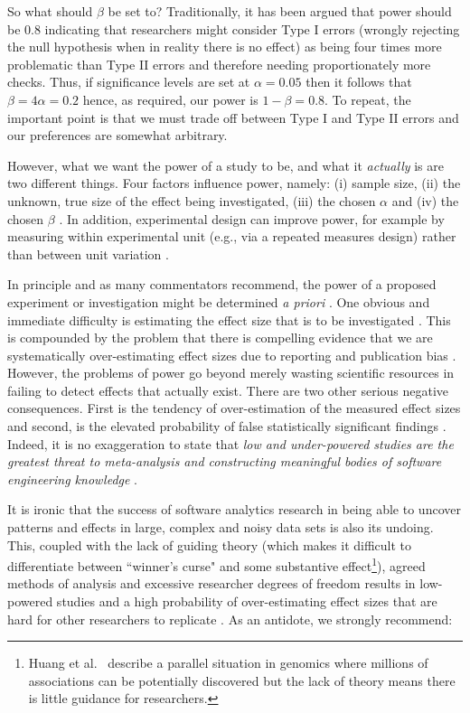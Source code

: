 \documentclass[preprint,10pt]{elsarticle}
\newcommand{\RED}{\color{red}}
\newcommand{\BLACK}{\color{black}}
\begin{document}
\RED So what should $\beta$ be set to?  \BLACK Traditionally, it has been argued that power should be 0.8 \cite{Cohe88} indicating that researchers might consider Type I errors (wrongly rejecting the null hypothesis when in reality there is no effect) as being four times more problematic than Type II errors and therefore needing proportionately more checks. Thus, if significance levels are set at $\alpha=0.05$ then it follows that $\beta = 4\alpha = 0.2$ hence, as required, our power is $1 - \beta = 0.8$.  To repeat, the important point is that we must trade off between Type I and Type II errors and our preferences are somewhat arbitrary.

\RED However, what we want the power of a study to be, and what it \textit{actually} is are two different things.  
\BLACK 
Four factors influence power, namely: (i) sample size, (ii) the unknown, true size of the effect being investigated, (iii) the chosen $\alpha$ and (iv) the chosen $\beta$ \cite{Cohe92,Elli10}.  In addition, experimental design can improve power, for example by measuring within experimental unit (e.g., via a repeated measures design) rather than between unit variation \cite{McCl00}.  

In principle and as many commentators recommend, the power of a proposed experiment or investigation might be determined \emph{a priori} \cite{Dyba06}.  One obvious and immediate difficulty is estimating the effect size that is to be investigated \cite{Maxw08}.  This is compounded by the problem that there is compelling evidence that we are systematically over-estimating effect sizes due to reporting and publication bias \cite{Butt13,Jorg16}.  However, the problems of power go beyond merely wasting scientific resources in failing to detect effects that actually exist.  There are two other serious negative consequences.  First is the tendency of over-estimation of the measured effect sizes and second, is the elevated probability of false statistically significant findings \cite{Ioan05,Colq14}.  Indeed, it is no exaggeration to state that \textit{low and under-powered studies are the greatest threat to meta-analysis and constructing meaningful bodies of software engineering knowledge} \cite{Butt13,Szuc17}.

It is ironic that the success of software analytics research in being able to uncover patterns and effects in large, complex and noisy data sets is also its undoing.  This, coupled with the lack of guiding theory (which makes it difficult to differentiate between ``winner's curse" and some substantive effect\footnote{\RED Huang et al.~\cite{Huan17} describe a parallel situation in genomics where millions of associations can be potentially discovered but the lack of theory means there is little guidance for researchers. \BLACK}), agreed methods of analysis and excessive researcher degrees of freedom \cite{Silb15,Loke17} results in low-powered studies and a high probability of over-estimating effect sizes that are hard for other researchers to replicate \cite{Ioan05,Shep14,Jorg16}.  As an antidote, we strongly recommend:
\end{document}

